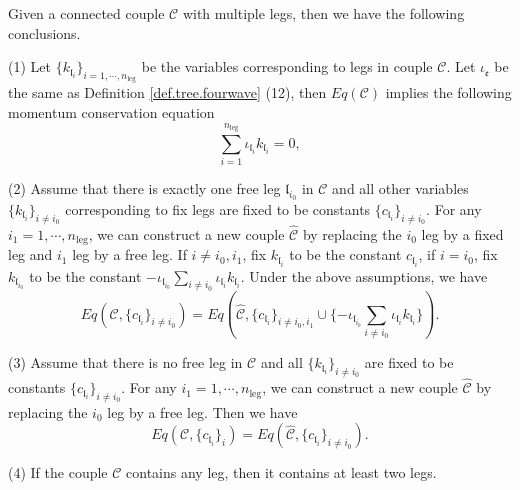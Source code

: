 \begin{lem}\label{lem.freeleg.fourwave} %
Given a connected couple $\mathcal{C}$ with multiple legs, then we have the following conclusions.

(1) Let $\{k_{\mathfrak{l}_i}\}_{i=1,\cdots,n_{\text{leg}}}$ be the variables corresponding to legs in couple $\mathcal{C}$. Let $\iota_{\mathfrak{e}}$ be the same as Definition \ref{def.tree.fourwave} (12), then $Eq(\mathcal{C})$ implies the following momentum conservation equation
\begin{equation}\label{eq.momentumconservation.fourwave}
 \sum_{i=1}^{n_{\text{leg}}} \iota_{\mathfrak{l}_i}k_{\mathfrak{l}_i}=0,
\end{equation}

(2) Assume that there is exactly one free leg $\mathfrak{l}_{i_0}$ in $\mathcal{C}$ and all other variables $\{k_{\mathfrak{l}_{i}}\}_{i\ne i_0}$ corresponding to fix legs are fixed to be constants $\{c_{\mathfrak{l}_{i}}\}_{i\ne i_0}$. For any $i_{1}=1,\cdots,n_{\text{leg}}$, we can construct a new couple $\widehat{\mathcal{C}}$ by replacing the $i_0$ leg by a fixed leg and $i_1$ leg by a free leg. If $i\ne i_0, i_1$, fix $k_{\mathfrak{l}_{i}}$ to be the constant $c_{\mathfrak{l}_{i}}$, if $i=i_0$, fix $k_{\mathfrak{l}_{i_0}}$ to be the constant $-\iota_{\mathfrak{l}_{i_0}}\sum_{i\ne i_0} \iota_{\mathfrak{l}_i}k_{\mathfrak{l}_i}$. Under the above assumptions, we have
\begin{equation}
 Eq(\mathcal{C}, \{c_{\mathfrak{l}_{i}}\}_{i\ne i_0})=Eq\left(\widehat{\mathcal{C}}, \{c_{\mathfrak{l}_{i}}\}_{i\ne i_0, i_1}\cup \{-\iota_{\mathfrak{l}_{i_0}}\sum_{i\ne i_0} \iota_{\mathfrak{l}_i}k_{\mathfrak{l}_i}\}\right).
\end{equation}

(3) Assume that there is no free leg in $\mathcal{C}$ and all $\{k_{\mathfrak{l}_{i}}\}_{i\ne i_0}$ are fixed to be constants $\{c_{\mathfrak{l}_{i}}\}_{i\ne i_0}$. For any $i_{1}=1,\cdots,n_{\text{leg}}$, we can construct a new couple $\widehat{\mathcal{C}}$ by replacing the $i_0$ leg by a free leg. Then we have
\begin{equation}
 Eq(\mathcal{C}, \{c_{\mathfrak{l}_{i}}\}_{i})=Eq(\widehat{\mathcal{C}}, \{c_{\mathfrak{l}_{i}}\}_{i\ne i_0}).
\end{equation}

(4) If the couple $\mathcal{C}$ contains any leg, then it contains at least two legs.

\end{lem}
